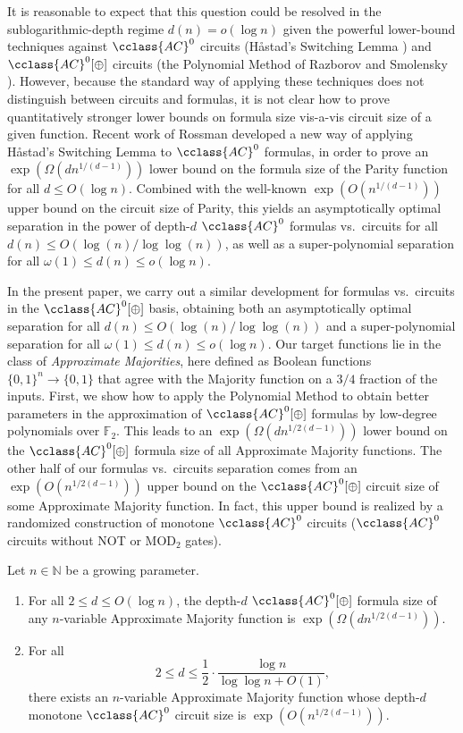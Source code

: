 \documentclass{toc}
\newcommand{\F}{\mathbb{F}}
\newcommand{\AC}{\cclass{AC}}
\begin{document}
It is reasonable to expect that this question could be resolved in the
%
sublogarithmic-depth  %
regime
%
$d(n) = o(\log n)$     %
given the powerful
%
lower-bound   %
techniques against $\AC^0$ circuits (H{\aa}stad's
Switching Lemma \cite{Hastad}) and $\AC^0[\oplus]$ circuits 
(the Polynomial Method of Razborov \cite{Razborov} and
Smolensky \cite{Smolensky87}). However, because the standard way
of applying these techniques does not distinguish between circuits
and formulas, it is not clear how to prove quantitatively stronger 
lower bounds on formula size vis-a-vis circuit size of a given function. 
Recent work of Rossman \cite{Rossman2015average} developed a new way of 
applying H{\aa}stad's Switching Lemma to $\AC^0$ formulas, in order to 
prove an $\exp(\Omega(dn^{1/(d-1)}))$ lower bound on the formula size 
of the Parity function for all $d \le O(\log n)$. Combined with the 
well-known $\exp(O(n^{1/(d-1)}))$ upper bound on the circuit size of 
Parity, this yields an asymptotically optimal separation in the 
power of depth-$d$ $\AC^0$ formulas vs.\ circuits for all 
$d(n) \le O({\log(n)}/{\log\log(n)})$, as well as a 
super-polynomial separation for all $\omega(1) \le d(n) \le o(\log n)$.

In the present paper, we carry out a similar development for formulas vs.\ circuits in the $\AC^0[\oplus]$ basis, obtaining both an asymptotically optimal separation for all $d(n) \le O({\log(n)}/{\log\log(n)})$ and a super-polynomial separation for all $\omega(1) \le d(n) \le o(\log n)$. Our target functions lie in the class of
\emph{Approximate Majorities}, here defined as Boolean 
functions $\{0,1\}^n \to \{0,1\}$ that  %
agree with  %
the Majority function on
a   %
$3/4$ fraction of
the  %
inputs. 
First, we show how to apply the Polynomial Method to obtain better parameters in the approximation of $\AC^0[\oplus]$ formulas by low-degree polynomials over $\F_2$. This leads to an $\exp(\Omega(dn^{1/2(d-1)}))$ lower bound on the $\AC^0[\oplus]$ formula size of all Approximate Majority functions. The other half of our formulas vs.\ circuits separation comes from an $\exp(O(n^{1/2(d-1)}))$ upper bound on the $\AC^0[\oplus]$ circuit size of some Approximate Majority function. In fact, this upper bound is realized by a randomized construction of monotone $\AC^0$ circuits
%
%
($\AC^0$ circuits without NOT or MOD$_2$ gates).   %


\begin{theorem}\label{thm:main}
Let $n \in \mathbb N$ be a growing parameter.
\begin{enumerate}
\item
For all $2 \le d \le O(\log n)$, the depth-$d$ $\AC^0[\oplus]$ formula size of any $n$-variable Approximate Majority function is $\exp(\Omega(dn^{1/2(d-1)}))$.
\item
  For all
  \[
    2 \le d \le \frac{1}{2}\cdot \frac{\log n}{\log\log n + O(1)},
  \]
  there exists an $n$-variable Approximate Majority function whose
  depth-$d$ monotone $\AC^0$ circuit size is $\exp(O(n^{1/2(d-1)}))$.
\end{enumerate}
\end{theorem}
\end{document}
